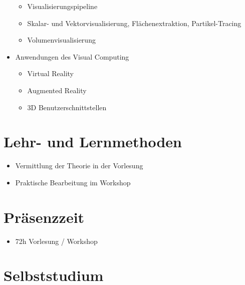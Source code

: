 \begin{itemize}
  \begin{itemize}
\tightlist
\item
    Visualisierungspipeline
  \item
    Skalar- und Vektorvisualisierung, Flächenextraktion,
    Partikel-Tracing
  \item
    Volumenvisualisierung
  \end{itemize}
\item
  Anwendungen des Visual Computing

  \begin{itemize}
\tightlist
\item
    Virtual Reality
  \item
    Augmented Reality
  \item
    3D Benutzerschnittstellen
  \end{itemize}
\end{itemize}

\hypertarget{lehr--und-lernmethodenpathlabel....srcmodulbeschreibungen-bachelor-bpo5ba_visual-computing}{%
\section*{Lehr- und
Lernmethoden\label{../../src/modulbeschreibungen-bachelor-bpo5/BA_Visual-Computing}}\label{lehr--und-lernmethodenpathlabel....srcmodulbeschreibungen-bachelor-bpo5ba_visual-computing}}

\begin{itemize}
\tightlist
\item
  Vermittlung der Theorie in der Vorlesung
\item
  Praktische Bearbeitung im Workshop
\end{itemize}

\hypertarget{pruxe4senzzeitpathlabel....srcmodulbeschreibungen-bachelor-bpo5ba_visual-computing}{%
\section*{Präsenzzeit\label{../../src/modulbeschreibungen-bachelor-bpo5/BA_Visual-Computing}}\label{pruxe4senzzeitpathlabel....srcmodulbeschreibungen-bachelor-bpo5ba_visual-computing}}

\begin{itemize}
\tightlist
\item
  72h Vorlesung / Workshop
\end{itemize}

\hypertarget{selbststudiumpathlabel....srcmodulbeschreibungen-bachelor-bpo5ba_visual-computing}{%
\section*{Selbststudium\label{../../src/modulbeschreibungen-bachelor-bpo5/BA_Visual-Computing}}\label{selbststudiumpathlabel....srcmodulbeschreibungen-bachelor-bpo5ba_visual-computing}}

